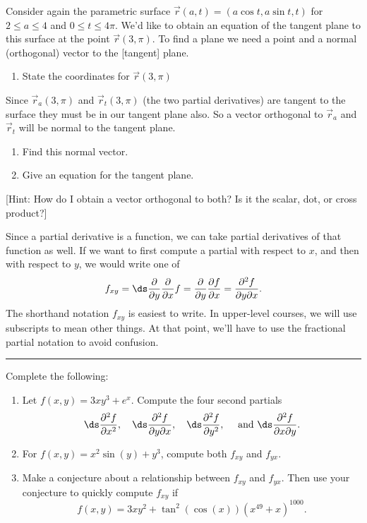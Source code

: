 \begin{problem}
 Consider again the parametric surface $\vec r(a,t) = (a\cos t, a\sin t, t)$ for $2\leq a\leq 4$ and $0\leq t\leq 4\pi$. 
 We'd like to obtain an equation of the tangent plane to this surface at the point $\vec r(3,\pi)$. To find a plane we need a point and a normal (orthogonal) vector to the [tangent] plane.
\begin{enumerate}
	\item State the coordinates for $\vec r (3,\pi)$
\end{enumerate}
Since $\vec r_a (3,\pi)$ and $\vec r_t (3, \pi)$ (the two partial derivatives) are tangent to the surface they must be in our tangent plane also. So a vector orthogonal to $\vec r_a$ and $\vec r_t$ will be normal to the tangent plane.
\begin{enumerate}[resume]
	\item Find this normal vector.
	\item Give an equation for the tangent plane.
\end{enumerate}

 [Hint: How do I obtain a vector orthogonal to both? Is it the scalar, dot, or cross product?]
\end{problem}


Since a partial derivative is a function, we can take partial derivatives of that function as well.  
If we want to first compute a partial with respect to $x$, and then with respect to $y$, we would write one of $$f_{xy}=\ds\frac{\partial}{\partial y}\frac{\partial}{\partial x}f = \frac{\partial}{\partial y}\frac{\partial f}{\partial x} = \frac{\partial^2 f}{\partial y \partial x}.$$
The shorthand notation $f_{xy}$ is easiest to write. In upper-level courses, we will use subscripts to mean other things. At that point, we'll have to use the fractional partial notation to avoid confusion.

\hrule

\begin{challenge}\label{prob:second partials agree}%
Complete the following:
\begin{enumerate}
 \item Let $f(x,y)=3xy^3+e^{x}.$
Compute the four second partials $$\ds \frac{\partial^2 f}{ \partial x^2},\quad \ds\frac{\partial^2 f}{\partial y \partial x},\quad \ds\frac{\partial^2 f}{\partial y^2}, \quad \text{ and }\ds\frac{\partial^2 f}{\partial x \partial y}.$$
 \item For $f(x,y)=x^2\sin(y)+y^3$, compute both $f_{xy}$ and $f_{yx}$.  
 \item Make a conjecture about a relationship between $f_{xy}$ and $f_{yx}$. Then use your conjecture to quickly compute $f_{xy}$ if $$f(x,y)=3xy^2+\tan^{2}(\cos(x)) (x^{49}+x)^{1000}.$$ 
\end{enumerate}
\end{challenge}

